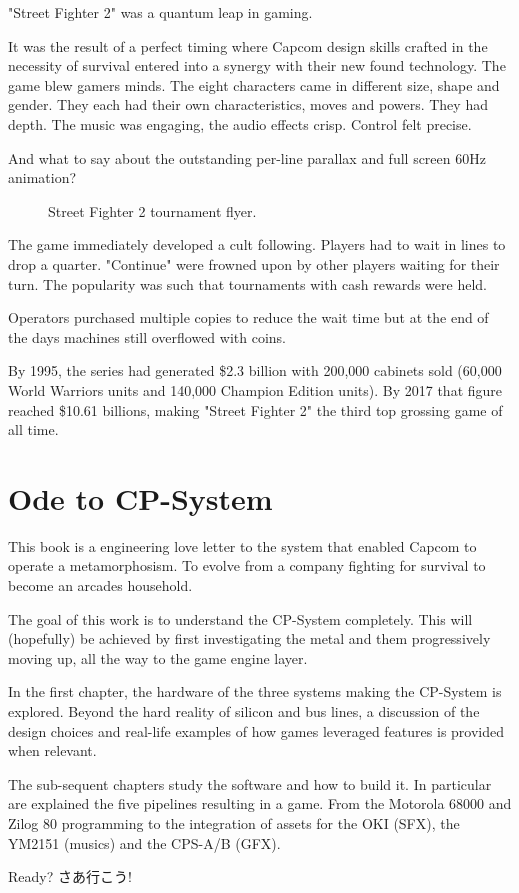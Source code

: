 "Street Fighter 2" was a quantum leap in gaming. 

It was the result of a perfect timing where Capcom design skills crafted in the necessity of survival entered into a synergy with their new found technology. The game blew gamers minds. The eight characters came in different size, shape and gender. They each had their own characteristics, moves and powers. They had depth. The music was engaging, the audio effects crisp. Control felt precise. 

And what to say about the outstanding per-line parallax and full screen 60Hz animation?






\label{nin_sf2}
\begin{figure}[H]
\caption*{Street Fighter 2 tournament flyer.}
\end{figure}

The game immediately developed a cult following. Players had to wait in lines to drop a quarter. "Continue" were frowned upon by other players waiting for their turn. The popularity was such that tournaments with cash rewards were held. 

Operators purchased multiple copies\cite{sf2_oral_history} to reduce the wait time but at the end of the days machines still overflowed with coins.



By 1995, the series had generated \$2.3 billion with 200,000 cabinets sold\cite{usgamer20160101} (60,000 World Warriors units and 140,000 Champion Edition units). By 2017 that figure reached \$10.61 billions\cite{gamerevolution20140126}, making "Street Fighter 2" the third top grossing game of all time.


\section{Ode to CP-System}

This book is a engineering love letter to the system that enabled Capcom to operate a metamorphosism. To evolve from a company fighting for survival to become an arcades household.

The goal of this work is to understand the CP-System completely. This will (hopefully) be achieved by first investigating the metal and them progressively moving up, all the way to the game engine layer.

In the first chapter, the hardware of the three systems making the CP-System is explored. Beyond the hard reality of silicon and bus lines, a discussion of the design choices and real-life examples of how games leveraged features is provided when relevant.

The sub-sequent chapters study the software and how to build it. In particular are explained the five pipelines resulting in a game. From the Motorola 68000 and Zilog 80 programming to the integration of assets for the OKI (SFX), the YM2151 (musics) and the CPS-A/B (GFX).


\begin{CJK}{UTF8}{min}
Ready? さあ行こう!
\end{CJK}



